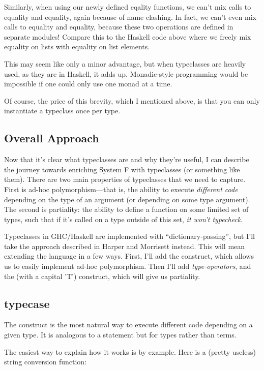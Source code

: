 \documentclass[pageno]{jpaper}
\begin{document}
{{{Similarly, when using our newly defined eqality functions, we can't mix calls to  equality
and  equality, again because of name clashing. In fact, we can't even mix calls to
 equality and  equality, because these two operations are defined in
separate modules! Compare this to the Haskell code above where we freely mix equality on lists with
equality on list elements.

This may seem like only a minor advantage, but when typeclasses are heavily used, as they are in Haskell, it adds up. Monadic-style programming would be impossible if one could only use one monad at a time.

Of course, the price of this brevity, which I mentioned above, is that you can only instantiate a typeclass
once per type.

\subsection{Overall Approach}
Now that it's clear what typeclasses are and why they're useful, I can describe the journey towards enriching System F with typeclasses (or something like them). There are two main properties
of typeclasses that we need to capture. First is ad-hoc polymorphism---that is, the ability to execute \textit{different code} depending on the type of an argument (or depending on some type argument).
The second is partiality: the ability to define a function on some limited set of types, such that if it's called on a type outside of this set, \textit{it won't typecheck}.

Typeclasses in GHC/Haskell are implemented with ``dictionary-passing'', but I'll take the approach described
in Harper and Morrisett \cite{harper-typecase} instead. This will mean extending the language in a few ways.  First, I'll add the
 construct, which allows us to easily implement ad-hoc polymorphism. Then I'll add
\textit{type-operators}, and the  (with a capital 'T') construct, which will give us
partiality.

\subsection{typecase}
The  construct is the most natural way to execute different code depending on a
given type. It is analogous to a  statement but for types rather than terms.

The easiest way to explain how it works is by example. Here is a (pretty useless) string conversion function:

}}}
\end{document}
